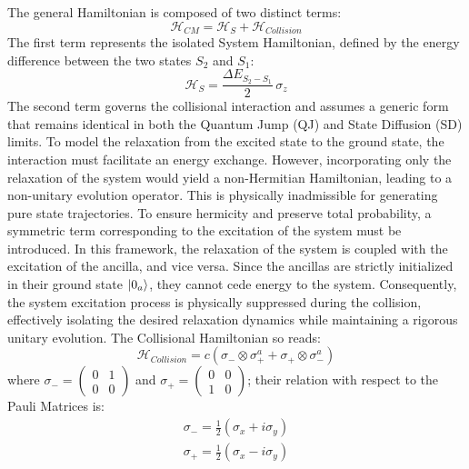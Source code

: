 \documentclass[a4paper,12pt]{article}
\begin{document}
The general Hamiltonian is composed of two distinct terms:
\begin{equation}
	\mathcal{H}_{CM} = \mathcal{H}_{S} + \mathcal{H}_{Collision}
	\label{eq:CM_PE_Hamiltonian}
\end{equation}
The first term represents the isolated System Hamiltonian, defined by the energy difference between the two states $S_2$ and $S_1$:
\begin{equation}
	\mathcal{H}_{S} = \frac{\Delta E_{S_{2} - S_{1}}}{2} \, \sigma_{z}
\end{equation}
The second term governs the collisional interaction and assumes a generic form that remains identical in both the Quantum Jump (QJ) and State Diffusion (SD) limits. To model the relaxation from the excited state to the ground state, the interaction must facilitate an energy exchange. However, incorporating only the relaxation of the system would yield a non-Hermitian Hamiltonian, leading to a non-unitary evolution operator. This is physically inadmissible for generating pure state trajectories. \newline
To ensure hermicity and preserve total probability, a symmetric term corresponding to the excitation of the system must be introduced. In this framework, the relaxation of the system is coupled with the excitation of the ancilla, and vice versa. Since the ancillas are strictly initialized in their ground state $\ket{0_{a}}$, they cannot cede energy to the system. Consequently, the system excitation process is physically suppressed during the collision, effectively isolating the desired relaxation dynamics while maintaining a rigorous unitary evolution. \newline
The Collisional Hamiltonian so reads:
\begin{equation}
	\mathcal{H}_{Collision} = c \left( \sigma_{-} \otimes \sigma_{+}^{a} + \sigma_{+} \otimes \sigma_{-}^{a} \right)
	\label{eq:H_Coll_explicit_PE}
\end{equation} 
where $ \sigma_{-} = \begin{pmatrix} 0 & 1 \\ 0 & 0 \end{pmatrix} $ and $ \sigma_{+} = \begin{pmatrix} 0 & 0 \\ 1 & 0 \end{pmatrix} $; their relation with respect to the Pauli Matrices is: 
\begin{gather}
	\sigma_{-} = \frac{1}{2} \left(\sigma_{x} + i \sigma_{y} \right) \\
	\sigma_{+} = \frac{1}{2} \left(\sigma_{x} - i \sigma_{y} \right)
\end{gather}
\end{document}
